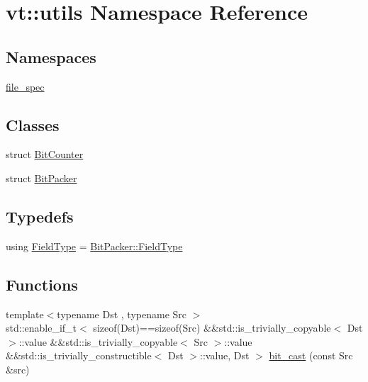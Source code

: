 \hypertarget{namespacevt_1_1utils}{}\section{vt\+:\+:utils Namespace Reference}
\label{namespacevt_1_1utils}
\subsection*{Namespaces}
\begin{DoxyCompactItemize}
\item 
 \hyperlink{namespacevt_1_1utils_1_1file__spec}{file\+\_\+spec}
\end{DoxyCompactItemize}
\subsection*{Classes}
\begin{DoxyCompactItemize}
\item 
struct \hyperlink{structvt_1_1utils_1_1_bit_counter}{Bit\+Counter}
\item 
struct \hyperlink{structvt_1_1utils_1_1_bit_packer}{Bit\+Packer}
\end{DoxyCompactItemize}
\subsection*{Typedefs}
\begin{DoxyCompactItemize}
\item 
using \hyperlink{namespacevt_1_1utils_a83bf4339dd1250f9880b6d4603320d39}{Field\+Type} = \hyperlink{structvt_1_1utils_1_1_bit_packer_a23024285425933c1f10c8fc3942f9beb}{Bit\+Packer\+::\+Field\+Type}
\end{DoxyCompactItemize}
\subsection*{Functions}
\begin{DoxyCompactItemize}
\item 
{\footnotesize template$<$typename Dst , typename Src $>$ }\\std\+::enable\+\_\+if\+\_\+t$<$ sizeof(Dst)==sizeof(Src) \&\&std\+::is\+\_\+trivially\+\_\+copyable$<$ Dst $>$\+::value \&\&std\+::is\+\_\+trivially\+\_\+copyable$<$ Src $>$\+::value \&\&std\+::is\+\_\+trivially\+\_\+constructible$<$ Dst $>$\+::value, Dst $>$ \hyperlink{namespacevt_1_1utils_a5aec27f45ff5fd0bacb4b589a100e5be}{bit\+\_\+cast} (const Src \&src)
\end{DoxyCompactItemize}


